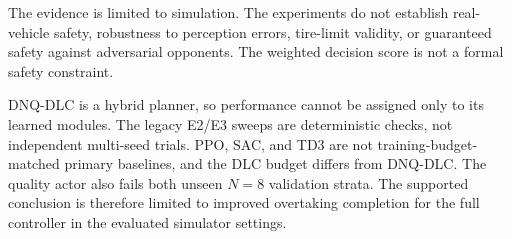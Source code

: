 \documentclass[journal]{IEEEtran}
\begin{document}
The evidence is limited to simulation. The experiments do not establish
real-vehicle safety, robustness to perception errors, tire-limit
validity, or guaranteed safety against adversarial opponents. The
weighted decision score is not a formal safety constraint.

DNQ-DLC is a hybrid planner, so performance cannot be assigned only to
its learned modules. The legacy E2/E3 sweeps are deterministic checks,
not independent multi-seed trials. PPO, SAC, and TD3 are not
training-budget-matched primary baselines, and the DLC budget differs
from DNQ-DLC. The quality actor also fails both unseen $N=8$ validation
strata. The supported conclusion is therefore limited to improved
overtaking completion for the full controller in the evaluated
simulator settings.



\end{document}

